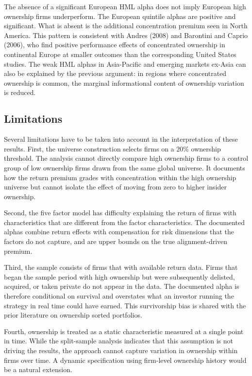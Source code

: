 The absence of a significant European HML alpha does not imply European high ownership firms underperform. The European quintile alphas are positive and significant. What is absent is the additional concentration premium seen in North America. This pattern is consistent with Andres (2008) and Barontini and Caprio (2006), who find positive performance effects of concentrated ownership in continental Europe at smaller outcomes than the corresponding United States studies. The weak HML alphas in Asia-Pacific and emerging markets ex-Asia can also be explained by the previous argument: in regions where concentrated ownership is common, the marginal informational content of ownership variation is reduced.


\subsection{Limitations}

Several limitations have to be taken into account in the interpretation of these results. First, the universe construction selects firms on a 20\% ownership threshold. The analysis cannot directly compare high ownership firms to a control group of low ownership firms drawn from the same global universe. It documents how the return premium grades with concentration within the high ownership universe but cannot isolate the effect of moving from zero to higher insider ownership.

Second, the five factor model has difficulty explaining the return of firms with characteristics that are different from the factor characteristics. The documented alphas combine return effects with compensation for risk dimensions that the factors do not capture, and are upper bounds on the true alignment-driven premium.

Third, the sample consists of firms that with available return data. Firms that began the sample period with high ownership but were subsequently delisted, acquired, or taken private do not appear in the data. The documented alpha is therefore conditional on survival and overstates what an investor running the strategy in real time could have earned. This survivorship bias is shared with the prior literature on ownership sorted portfolios.

Fourth, ownership is treated as a static characteristic measured at a single point in time. While the split-sample analysis indicates that this assumption is not driving the results, the approach cannot capture variation in ownership within firms over time. A dynamic specification using firm-level ownership history would be a natural extension.
